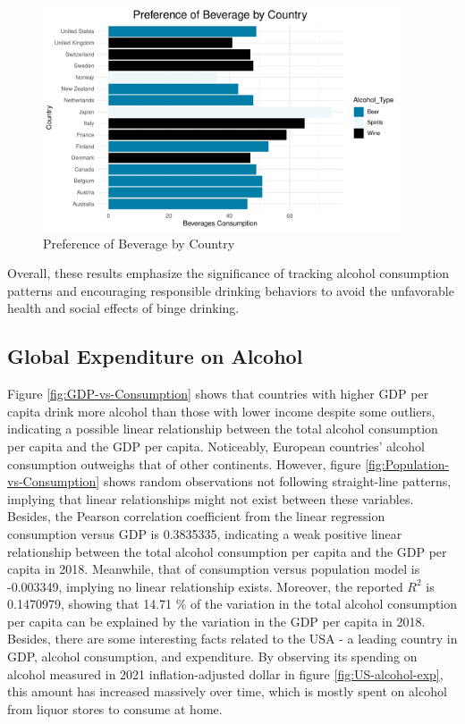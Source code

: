 \documentclass[11pt,a4paper,]{article}
\begin{document}
\begin{figure}

{\centering \includegraphics[width=400px,height=250px]{alcohol_analysis_files/figure-latex/graph-1} 

}

\caption{Preference of Beverage by Country}\label{fig:graph}
\end{figure}

Overall, these results emphasize the significance of tracking alcohol consumption patterns
and encouraging responsible drinking behaviors to avoid the unfavorable health and social effects of binge drinking.

\subsection{Global Expenditure on Alcohol}\label{global-expenditure-on-alcohol}

Figure \ref{fig:GDP-vs-Consumption} shows that countries with higher GDP per capita drink more alcohol than those with lower income despite some outliers, indicating a possible linear relationship between the total alcohol consumption per capita and the GDP per capita. Noticeably, European countries' alcohol consumption outweighs that of other continents. However, figure \ref{fig:Population-vs-Consumption} shows random observations not following straight-line patterns, implying that linear relationships might not exist between these variables.
Besides, the Pearson correlation coefficient from the linear regression consumption versus GDP is 0.3835335, indicating a weak positive linear relationship between the total alcohol consumption per capita and the GDP per capita in 2018. Meanwhile, that of consumption versus population model is -0.003349, implying no linear relationship exists. Moreover, the reported \(R^2\) is 0.1470979, showing that 14.71 \% of the variation in the total alcohol consumption per capita can be explained by the variation in the GDP per capita in 2018.
Besides, there are some interesting facts related to the USA - a leading country in GDP, alcohol consumption, and expenditure. By observing its spending on alcohol measured in 2021 inflation-adjusted dollar in figure \ref{fig:US-alcohol-exp}, this amount has increased massively over time, which is mostly spent on alcohol from liquor stores to consume at home.
\end{document}
